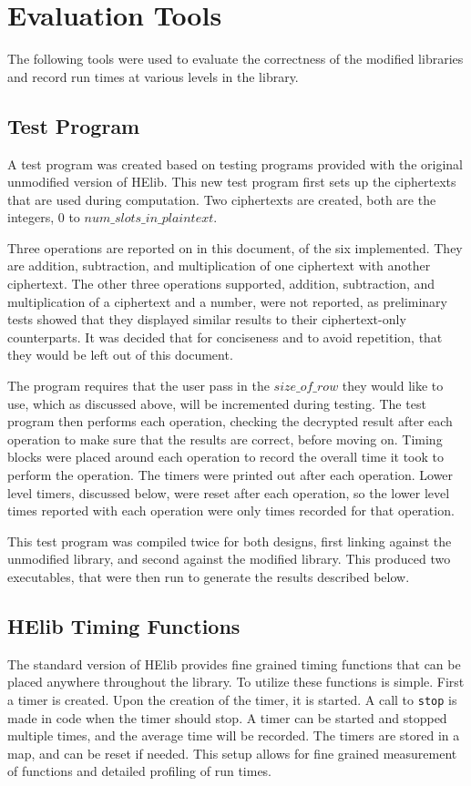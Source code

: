 \section{Evaluation Tools} \label{sec:EvaluationTools}
The following tools were used to evaluate the correctness of the modified libraries and record run times at various levels in the library.

\subsection{Test Program}
A test program was created based on testing programs provided with the original unmodified version of HElib. This new test program first sets up the ciphertexts that are used during computation. Two ciphertexts are created, both are the integers, $0$ to $ num\_slots\_in\_plaintext$. 

Three operations are reported on in this document, of the six implemented. They are addition, subtraction, and multiplication of one ciphertext with another ciphertext. The other three operations supported, addition, subtraction, and multiplication of a ciphertext and a number, were not reported, as preliminary tests showed that they displayed similar results to their ciphertext-only counterparts. It was decided that for conciseness and to avoid repetition, that they would be left out of this document.

The program requires that the user pass in the $size\_of\_row$ they would like to use, which as discussed above, will be incremented during testing. The test program then performs each operation, checking the decrypted result after each operation to make sure that the results are correct, before moving on. Timing blocks were placed around each operation to record the overall time it took to perform the operation. The timers were printed out after each operation. Lower level timers, discussed below, were reset after each operation, so the lower level times reported with each operation were only times recorded for that operation.

This test program was compiled twice for both designs, first linking against the unmodified library, and second against the modified library. This produced two executables, that were then run to generate the results described below.

\subsection{HElib Timing Functions}
The standard version of HElib provides fine grained timing functions that can be placed anywhere throughout the library. To utilize these functions is simple. First a timer is created. Upon the creation of the timer, it is started. A call to \verb|stop| is made in code when the timer should stop. A timer can be started and stopped multiple times, and the average time will be recorded. The timers are stored in a map, and can be reset if needed. This setup allows for fine grained measurement of functions and detailed profiling of run times. 

